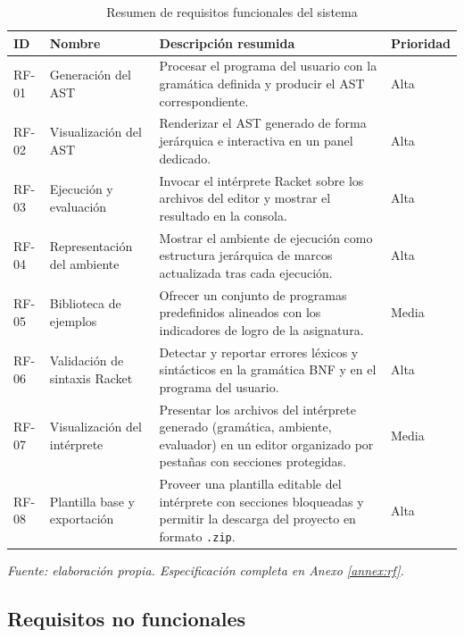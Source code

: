 \begin{table}[H]
\centering
\caption{Resumen de requisitos funcionales del sistema}
\label{tab:rf_resumen}
\footnotesize
\setlength{\tabcolsep}{4pt}
\begin{tabular}{
  >{\centering\arraybackslash}p{1.4cm}
  >{\raggedright\arraybackslash}p{5.2cm}
  >{\raggedright\arraybackslash}p{6.5cm}
  >{\centering\arraybackslash}p{1.3cm}
}
\hline
\textbf{ID} & \textbf{Nombre} & \textbf{Descripción resumida} & \textbf{Prioridad} \\
\hline
RF-01 & Generación del AST & Procesar el programa del usuario con la gramática definida y producir el AST correspondiente. & Alta \\
RF-02 & Visualización del AST & Renderizar el AST generado de forma jerárquica e interactiva en un panel dedicado. & Alta \\
RF-03 & Ejecución y evaluación & Invocar el intérprete Racket sobre los archivos del editor y mostrar el resultado en la consola. & Alta \\
RF-04 & Representación del ambiente & Mostrar el ambiente de ejecución como estructura jerárquica de marcos actualizada tras cada ejecución. & Alta \\
RF-05 & Biblioteca de ejemplos & Ofrecer un conjunto de programas predefinidos alineados con los indicadores de logro de la asignatura. & Media \\
RF-06 & Validación de sintaxis Racket & Detectar y reportar errores léxicos y sintácticos en la gramática BNF y en el programa del usuario. & Alta \\
RF-07 & Visualización del intérprete & Presentar los archivos del intérprete generado (gramática, ambiente, evaluador) en un editor organizado por pestañas con secciones protegidas. & Media \\
RF-08 & Plantilla base y exportación & Proveer una plantilla editable del intérprete con secciones bloqueadas y permitir la descarga del proyecto en formato \texttt{.zip}. & Alta \\
\hline
\end{tabular}
\vskip 4pt
\footnotesize\textit{Fuente: elaboración propia. Especificación completa en Anexo \ref{annex:rf}.}
\end{table}

\FloatBarrier

\subsection{Requisitos no funcionales}

